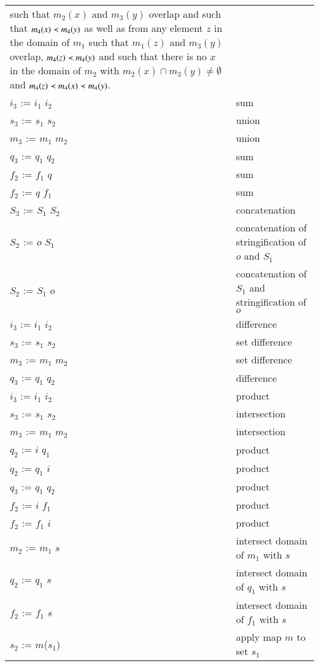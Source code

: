 \begin{supertabular}{p{0.35\textwidth}p{0.6\textwidth}}
such that $m_2(x)$ and $m_3(y)$ overlap and such that $m_4(x) \prec m_4(y)$
as well as from any element $z$ in the domain of $m_1$ such that
$m_1(z)$ and $m_3(y)$ overlap, $m_4(z) \prec m_4(y)$ and such that there
is no $x$ in the domain of $m_2$ with
$m_2(x) \cap m_3(y) \ne \emptyset$ and $m_4(z) \prec m_4(x) \prec m_4(y)$.
\\
$i_3$ := $i_1$ \ai{$+$} $i_2$ & sum
\\
$s_3$ := $s_1$ \ai{$+$} $s_2$ & union
\\
$m_3$ := $m_1$ \ai{$+$} $m_2$ & union
\\
$q_3$ := $q_1$ \ai{$+$} $q_2$ & sum
\\
$f_2$ := $f_1$ \ai{$+$} $q$ & sum
\\
$f_2$ := $q$ \ai{$+$} $f_1$ & sum
\\
$S_3$ := $S_1$ \ai{$+$} $S_2$ & concatenation
\\
$S_2$ := $o$ \ai{$+$} $S_1$ &
concatenation of stringification of $o$ and $S_1$
\\
$S_2$ := $S_1$ \ai{$+$} $o$ &
concatenation of $S_1$ and stringification of $o$
\\
$i_3$ := $i_1$ \ai{$-$} $i_2$ & difference
\\
$s_3$ := $s_1$ \ai{$-$} $s_2$ & set difference
\\
$m_3$ := $m_1$ \ai{$-$} $m_2$ & set difference
\\
$q_3$ := $q_1$ \ai{$-$} $q_2$ & difference
\\
$i_3$ := $i_1$ \ai{$*$} $i_2$ & product
\\
$s_3$ := $s_1$ \ai{$*$} $s_2$ & intersection
\\
$m_3$ := $m_1$ \ai{$*$} $m_2$ & intersection
\\
$q_2$ := $i$ \ai{$*$} $q_1$ & product
\\
$q_2$ := $q_1$ \ai{$*$} $i$ & product
\\
$q_3$ := $q_1$ \ai{$*$} $q_2$ & product
\\
$f_2$ := $i$ \ai{$*$} $f_1$ & product
\\
$f_2$ := $f_1$ \ai{$*$} $i$ & product
\\
$m_2$ := $m_1$ \ai{$*$} $s$ & intersect domain of $m_1$ with $s$
\\
$q_2$ := $q_1$ \ai{$*$} $s$ & intersect domain of $q_1$ with $s$
\\
$f_2$ := $f_1$ \ai{$*$} $s$ & intersect domain of $f_1$ with $s$
\\
$s_2$ := $m$($s_1$) & apply map $m$ to set $s_1$
\\

\end{supertabular}
